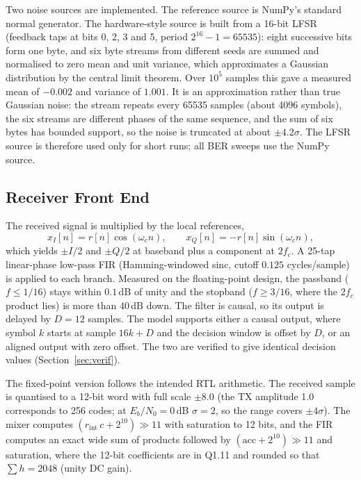 \documentclass[10pt,twocolumn,letterpaper]{article}
\begin{document}
Two noise sources are implemented. The reference source is NumPy's standard
normal generator. The hardware-style source is built from a 16-bit LFSR
(feedback taps at bits 0, 2, 3 and 5, period $2^{16}-1=65535$): eight
successive bits form one byte, and six byte streams from different seeds are
summed and normalised to zero mean and unit variance, which approximates a
Gaussian distribution by the central limit theorem. Over $10^5$ samples this
gave a measured mean of $-0.002$ and variance of $1.001$. It is an
approximation rather than true Gaussian noise: the stream repeats every 65535
samples (about 4096 symbols), the six streams are different phases of the same
sequence, and the sum of six bytes has bounded support, so the noise is
truncated at about $\pm4.2\sigma$. The LFSR source is therefore used only for
short runs; all BER sweeps use the NumPy source.

\subsection{Receiver Front End}

The received signal is multiplied by the local references,
\begin{equation}
x_I[n]=r[n]\cos(\omega_c n), \qquad x_Q[n]=-r[n]\sin(\omega_c n),
\end{equation}
which yields $\pm I/2$ and $\pm Q/2$ at baseband plus a component at
$2f_c$. A 25-tap linear-phase low-pass FIR (Hamming-windowed sinc, cutoff
$0.125$ cycles/sample) is applied to each branch. Measured on the
floating-point design, the passband
($f\le 1/16$) stays within $0.1$\,dB of unity and the stopband ($f\ge 3/16$,
where the $2f_c$ product lies) is more than $40$\,dB down. The filter is
causal, so its output is delayed by $D=12$ samples. The model supports either
a causal output, where symbol $k$ starts at sample $16k+D$ and the decision
window is offset by $D$, or an aligned output with zero offset. The two are
verified to give identical decision values (Section~\ref{sec:verif}).

The fixed-point version follows the intended RTL arithmetic. The received
sample is quantised to a 12-bit word with full scale $\pm8.0$ (the TX
amplitude 1.0 corresponds to 256 codes; at $E_b/N_0=0$\,dB $\sigma=2$, so the
range covers $\pm4\sigma$). The mixer computes
$(r_{\mathrm{int}}\,c+2^{10})\gg 11$ with saturation to 12 bits, and the FIR
computes an exact wide sum of products followed by $(\mathrm{acc}+2^{10})\gg 11$
and saturation, where the 12-bit coefficients are in Q1.11 and rounded so that
$\sum h=2048$ (unity DC gain).
\end{document}

